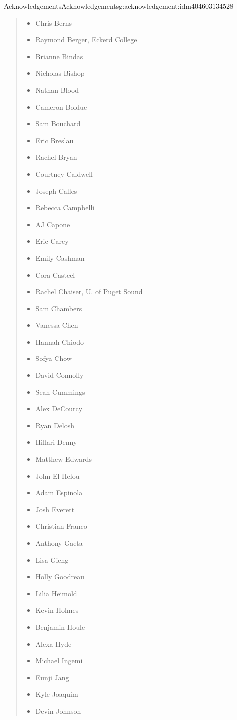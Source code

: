 \documentclass[twoside,10pt,]{book}
\numberwithin{equation}{section}
\begin{document}
\begin{acknowledgement}{Acknowledgements}{}{Acknowledgements}{}{}{g:acknowledgement:idm404603134528}
\begin{quote}
\begin{multicols}{2}
\begin{itemize}[label=\textbullet]
\item{}Chris Berns%
\item{}Raymond Berger, Eckerd College%
\item{}Brianne Bindas%
\item{}Nicholas Bishop%
\item{}Nathan Blood%
\item{}Cameron Bolduc%
\item{}Sam Bouchard%
\item{}Eric Breslau%
\item{}Rachel Bryan%
\item{}Courtney Caldwell%
\item{}Joseph Calles%
\item{}Rebecca Campbelli%
\item{}AJ Capone%
\item{}Eric Carey%
\item{}Emily Cashman%
\item{}Cora Casteel%
\item{}Rachel Chaiser, U. of Puget Sound%
\item{}Sam Chambers%
\item{}Vanessa Chen%
\item{}Hannah Chiodo%
\item{}Sofya Chow%
\item{}David Connolly%
\item{}Sean Cummings%
\item{}Alex DeCourcy%
\item{}Ryan Delosh%
\item{}Hillari Denny%
\item{}Matthew Edwards%
\item{}John El-Helou%
\item{}Adam Espinola%
\item{}Josh Everett%
\item{}Christian Franco%
\item{}Anthony Gaeta%
\item{}Lisa Gieng%
\item{}Holly Goodreau%
\item{}Lilia Heimold%
\item{}Kevin Holmes%
\item{}Benjamin Houle%
\item{}Alexa Hyde%
\item{}Michael Ingemi%
\item{}Eunji Jang%
\item{}Kyle Joaquim%
\item{}Devin Johnson%

\end{itemize}
\end{multicols}
\end{quote}
\end{acknowledgement}
\end{document}

